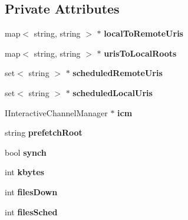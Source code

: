 \subsection*{Private Attributes}
\begin{CompactItemize}
\item 
map$<$ string, string $>$ $\ast$ {\bf localToRemoteUris}\label{classbr_1_1pucrio_1_1telemidia_1_1ginga_1_1ncl_1_1prefetch_1_1PrefetchManager_efb291bff7c6ae3546e76d2a325732b9}

\item 
map$<$ string, string $>$ $\ast$ {\bf urisToLocalRoots}\label{classbr_1_1pucrio_1_1telemidia_1_1ginga_1_1ncl_1_1prefetch_1_1PrefetchManager_85bc3c626feec53a5631de355ecfb586}

\item 
set$<$ string $>$ $\ast$ {\bf scheduledRemoteUris}\label{classbr_1_1pucrio_1_1telemidia_1_1ginga_1_1ncl_1_1prefetch_1_1PrefetchManager_8550f13f18d1ef5662e8736f97e976b5}

\item 
set$<$ string $>$ $\ast$ {\bf scheduledLocalUris}\label{classbr_1_1pucrio_1_1telemidia_1_1ginga_1_1ncl_1_1prefetch_1_1PrefetchManager_8e444c0b30f71ca8068e23e185b90476}

\item 
IInteractiveChannelManager $\ast$ {\bf icm}\label{classbr_1_1pucrio_1_1telemidia_1_1ginga_1_1ncl_1_1prefetch_1_1PrefetchManager_0031ba91fa2b40477855eacfea1b1a94}

\item 
string {\bf prefetchRoot}\label{classbr_1_1pucrio_1_1telemidia_1_1ginga_1_1ncl_1_1prefetch_1_1PrefetchManager_000fa6824d9fe0f360fd380235350e95}

\item 
bool {\bf synch}\label{classbr_1_1pucrio_1_1telemidia_1_1ginga_1_1ncl_1_1prefetch_1_1PrefetchManager_a13c3210c751d3d99a12934d2588a2cc}

\item 
int {\bf kbytes}\label{classbr_1_1pucrio_1_1telemidia_1_1ginga_1_1ncl_1_1prefetch_1_1PrefetchManager_0a49bb44507005527dd7849fee99c1ce}

\item 
int {\bf filesDown}\label{classbr_1_1pucrio_1_1telemidia_1_1ginga_1_1ncl_1_1prefetch_1_1PrefetchManager_267e78dc8258b190326a7667d09ff3d1}

\item 
int {\bf filesSched}\label{classbr_1_1pucrio_1_1telemidia_1_1ginga_1_1ncl_1_1prefetch_1_1PrefetchManager_88c520723bc62b78f29060af6120a780}

\end{CompactItemize}

